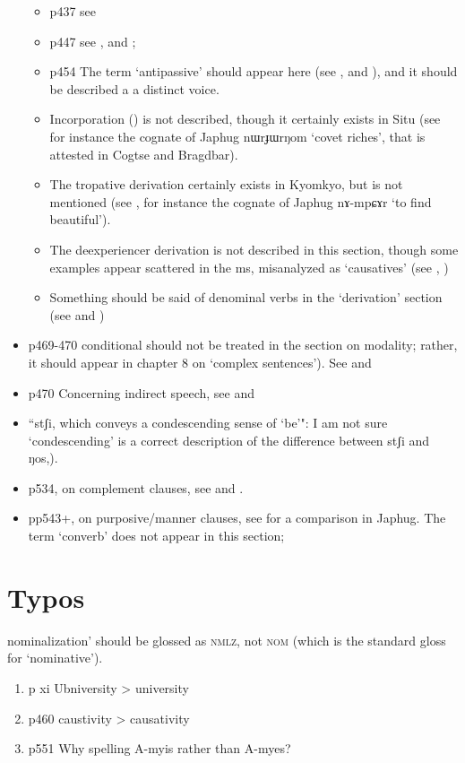 \documentclass[oldfontcommands,oneside,a4paper,11pt]{article}
\newcommand{\ipa}[1]{{\phon \mbox{#1}}} %
\begin{document}
\begin{itemize}
\begin{itemize}
\item p437 see \citet{jacques10refl}
\item p447 see \citet{jacques07passif}, \citet{jacques12demotion} and \citet{jackson14morpho}; 
\item p454 The  term `antipassive' should appear here (see \citealt{jacques12demotion}, \citet{jacques14antipassive} and \citet{jackson14morpho}), and it should be described a a distinct voice.
\item Incorporation (\citealt{jacques12incorp}) is not described, though it certainly exists in Situ (see for instance the cognate of Japhug \ipa{nɯrɟɯrŋom} `covet riches', that is attested in Cogtse and Bragdbar). 
\item The tropative derivation certainly exists in Kyomkyo, but is not mentioned (see \citealt{jacques13tropative}, for instance the cognate of Japhug \ipa{nɤ-mpɕɤr} `to find beautiful').
\item The deexperiencer derivation is not described in this section, though some examples appear scattered in the ms, misanalyzed as `causatives' (see \citealt{jacques12demotion}, \citet{jackson14morpho})
\item Something should be said of denominal verbs in the `derivation' section (see \citealt{jacques14antipassive} and \citealt{jacques13tropative})
\end{itemize}
\item  p469-470 conditional should not be treated in the section on modality; rather, it should appear in chapter 8 on `complex sentences'). See \citet{jackson07irrealis} and \citet[295-303]{jacques14linking}
\item p470 Concerning indirect speech, see \citet[344-346]{jacques08zh} and \citet[310-311]{jacques14linking}
\item ``\ipa{stʃi}, which conveys a condescending sense of ‘be’": I am not sure `condescending' is a correct description of the difference between \ipa{stʃi} and \ipa{ŋos,}).
\item p534, on complement clauses, see \citet[3337-353]{jacques08zh}  and \citet{sun12complementation}.
\item pp543+, on purposive/manner clauses, see \citet{jacques14linking} for a comparison in Japhug. The term `converb' does not appear in this section; 
\end{itemize}
 

 
 
\section{Typos}

 nominalization' should be glossed as \textsc{nmlz}, not \textsc{nom} (which is the standard gloss for `nominative').
\begin{enumerate}
\item p xi Ubniversity > university
\item p460 caustivity > causativity
\item p551 Why spelling A-myis rather  than A-myes?
\end{enumerate}  
  
  


\end{document}
